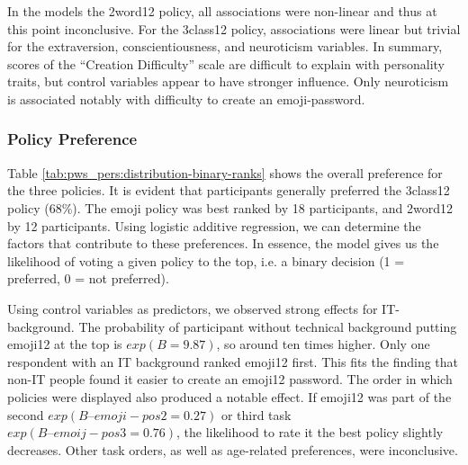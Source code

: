 
In the models the 2word12 policy, all associations were non-linear and thus at this point inconclusive. For the 3class12 policy, associations were linear but trivial for the extraversion, conscientiousness, and neuroticism variables. In summary, scores of the ``Creation Difficulty'' scale are difficult to explain with personality traits, but control variables appear to have stronger influence. Only neuroticism is associated notably with difficulty to create an emoji-password.

\subsubsection{Policy Preference}
Table \ref{tab:pws_pers:distribution-binary-ranks} shows the overall preference for the three policies. It is evident that participants generally preferred the 3class12 policy (68\%). The emoji policy was best ranked by 18 participants, and 2word12 by 12 participants. Using logistic additive regression, we can determine the factors that contribute to these preferences. %
In essence, the model gives us the likelihood of voting a given policy to the top, i.e. a binary decision (1 = preferred, 0 = not preferred). 

Using control variables as predictors, we observed strong effects for IT-background. The probability of participant without technical background putting emoji12 at the top is $exp(B=9.87)$, so around ten times higher. Only one respondent with an IT background ranked emoji12 first. This fits the finding that non-IT people found it easier to create an emoji12 password.
The order in which policies were displayed also produced a notable effect. If emoji12 was part of the second $exp(B–{emoji-pos2}=0.27)$ or third task $exp(B–{emoij-pos3}=0.76)$, the likelihood to rate it the best policy slightly decreases. Other task orders, as well as age-related preferences, were inconclusive.

